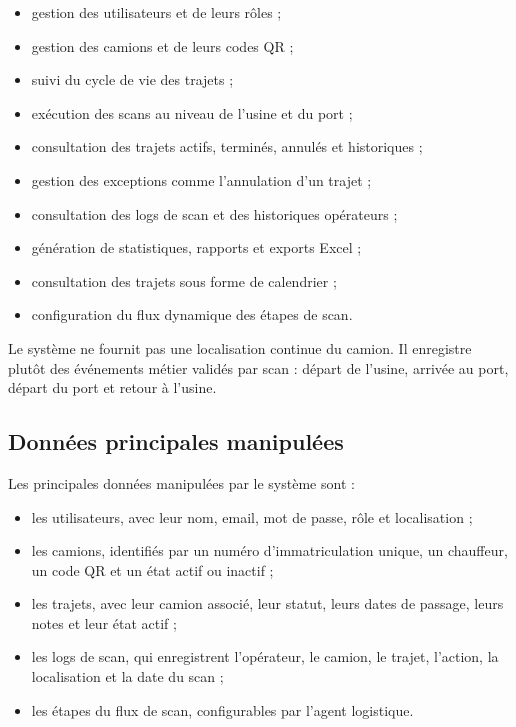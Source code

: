 \begin{itemize}
    \item gestion des utilisateurs et de leurs rôles ;
    \item gestion des camions et de leurs codes QR ;
    \item suivi du cycle de vie des trajets ;
    \item exécution des scans au niveau de l'usine et du port ;
    \item consultation des trajets actifs, terminés, annulés et historiques ;
    \item gestion des exceptions comme l'annulation d'un trajet ;
    \item consultation des logs de scan et des historiques opérateurs ;
    \item génération de statistiques, rapports et exports Excel ;
    \item consultation des trajets sous forme de calendrier ;
    \item configuration du flux dynamique des étapes de scan.
\end{itemize}

Le système ne fournit pas une localisation continue du camion. Il enregistre plutôt des événements métier validés par scan : départ de l'usine, arrivée au port, départ du port et retour à l'usine.

\subsection{Données principales manipulées}

Les principales données manipulées par le système sont :

\begin{itemize}
    \item les utilisateurs, avec leur nom, email, mot de passe, rôle et localisation ;
    \item les camions, identifiés par un numéro d'immatriculation unique, un chauffeur, un code QR et un état actif ou inactif ;
    \item les trajets, avec leur camion associé, leur statut, leurs dates de passage, leurs notes et leur état actif ;
    \item les logs de scan, qui enregistrent l'opérateur, le camion, le trajet, l'action, la localisation et la date du scan ;
    \item les étapes du flux de scan, configurables par l'agent logistique.
\end{itemize}

